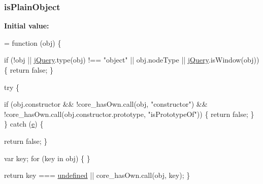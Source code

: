 \subsubsection[{\texorpdfstring{is\+Plain\+Object}{isPlainObject}}]{ is\+Plain\+Object}\hypertarget{jquery-2_82_81-vsdoc_8js_ae530048a5c13705fa969015adba370e4}{}\label{jquery-2_82_81-vsdoc_8js_ae530048a5c13705fa969015adba370e4}
{\bfseries Initial value\+:}
\begin{DoxyCode}
= \textcolor{keyword}{function} (obj) \{
        

        
        
        
        \textcolor{keywordflow}{if} (!obj || \hyperlink{jquery-2_82_81-vsdoc_8js_add5237586d970a38a81f990e8eb28c6c}{jQuery}.type(obj) !== \textcolor{stringliteral}{"object"} || obj.nodeType || 
      \hyperlink{jquery-2_82_81-vsdoc_8js_add5237586d970a38a81f990e8eb28c6c}{jQuery}.isWindow(obj)) \{
            \textcolor{keywordflow}{return} \textcolor{keyword}{false};
        \}

        \textcolor{keywordflow}{try} \{
            
            \textcolor{keywordflow}{if} (obj.constructor &&
                !core\_hasOwn.call(obj, \textcolor{stringliteral}{"constructor"}) &&
                !core\_hasOwn.call(obj.constructor.prototype, \textcolor{stringliteral}{"isPrototypeOf"})) \{
                \textcolor{keywordflow}{return} \textcolor{keyword}{false};
            \}
        \} \textcolor{keywordflow}{catch} (\hyperlink{packages_2bootstrap_83_83_86_2content_2_scripts_2bootstrap_8min_8js_ab5902775854a8b8440bcd25e0fe1c120}{e}) \{
            
            \textcolor{keywordflow}{return} \textcolor{keyword}{false};
        \}

        
        

        var key;
        \textcolor{keywordflow}{for} (key in obj) \{ \}

        \textcolor{keywordflow}{return} key === \hyperlink{jquery-2_82_81-vsdoc_8js_a08113a236cc18d2a9d5ce27e638012be}{undefined} || core\_hasOwn.call(obj, key);
    \}
\end{DoxyCode}

